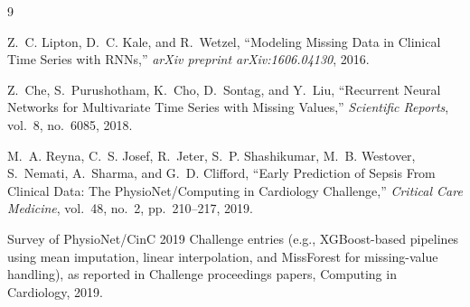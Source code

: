 \documentclass[11pt,a4paper]{article}
\begin{document}
\begin{thebibliography}{9}

Z.~C. Lipton, D.~C. Kale, and R.~Wetzel, ``Modeling Missing Data in Clinical
Time Series with RNNs,'' \emph{arXiv preprint arXiv:1606.04130}, 2016.

Z.~Che, S.~Purushotham, K.~Cho, D.~Sontag, and Y.~Liu, ``Recurrent Neural
Networks for Multivariate Time Series with Missing Values,'' \emph{Scientific
Reports}, vol.~8, no.~6085, 2018.

M.~A. Reyna, C.~S. Josef, R.~Jeter, S.~P. Shashikumar, M.~B. Westover,
S.~Nemati, A.~Sharma, and G.~D. Clifford, ``Early Prediction of Sepsis From
Clinical Data: The PhysioNet/Computing in Cardiology Challenge,''
\emph{Critical Care Medicine}, vol.~48, no.~2, pp.~210--217, 2019.

Survey of PhysioNet/CinC 2019 Challenge entries (e.g., XGBoost-based
pipelines using mean imputation, linear interpolation, and MissForest for
missing-value handling), as reported in Challenge proceedings papers,
Computing in Cardiology, 2019.

\end{thebibliography}
\end{document}
